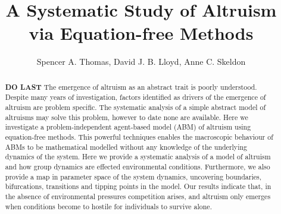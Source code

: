 \documentclass[11pt]{article}
\begin{document}
\title{A Systematic Study of Altruism via Equation-free Methods}

\author{Spencer A. Thomas, David J. B. Lloyd, Anne C. Skeldon}
\date{}
\maketitle

\renewcommand{\vec}[1]{\mathbf{#1}}


\begin{abstract}
%
%

{\bf DO LAST}
The emergence of altruism as an abstract trait is poorly understood. Despite many years of investigation, factors identified as drivers of the emergence of altruism are problem specific. The systematic analysis of a simple abstract model of altruisms may solve this problem, however to date none are available. Here we investigate a problem-independent agent-based model (ABM) of altruism using equation-free methods. This powerful techniques enables the macroscopic behaviour of ABMs to be mathematical modelled without any knowledge of the underlying dynamics of the system. Here we provide a systematic analysis of a model of altruism and how group dynamics are effected environmental conditions. Furthermore, we also provide a map in parameter space of the system dynamics, uncovering boundaries, bifurcations, transitions and tipping points in the model. Our results indicate that, in the absence of environmental pressures competition arises, and altruism only emerges when conditions become to hostile for individuals to survive alone. 

\end{abstract}
\end{document}
